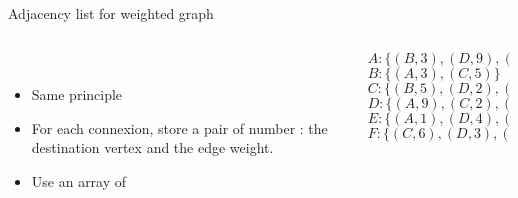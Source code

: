 \documentclass[handout,code={Graphs I},title={Introduction, DFS, BFS}]{../share/cpslide}
\begin{document}
\begin{frame}{Adjacency list for weighted graph}
\begin{columns}[T] %
\begin{column}[b]{0.6\linewidth}
\begin{minipage}{\linewidth}

\begin{figure}
\begin{adjustbox}{max totalsize={.4\textwidth}{.4\textheight}}
\\
\end{adjustbox}
\end{figure}

\begin{itemize}
\item Same principle 
\item For each connexion, store a pair of number : the destination vertex and the edge weight.
\item Use an array of 

\end{itemize}
\end{minipage}
\end{column}
\begin{column}[b]{0.45\linewidth}
\begin{minipage}{\linewidth}
\footnotesize{
$A: \{(B, 3), (D, 9), (E, 1)\}$\\
$B: \{(A, 3), (C, 5)\}$\\
$C: \{(B, 5), (D, 2), (F, 6)\}$\\
$D: \{(A, 9), (C, 2), (E, 4), (F, 3)\}$\\
$E: \{(A, 1), (D,4), (F, 7)\}$\\
$F: \{(C, 6), (D,3) , (E, 7)\}$\\
}



\end{minipage}
\end{column}
\end{columns}


\end{frame}
\end{document}
